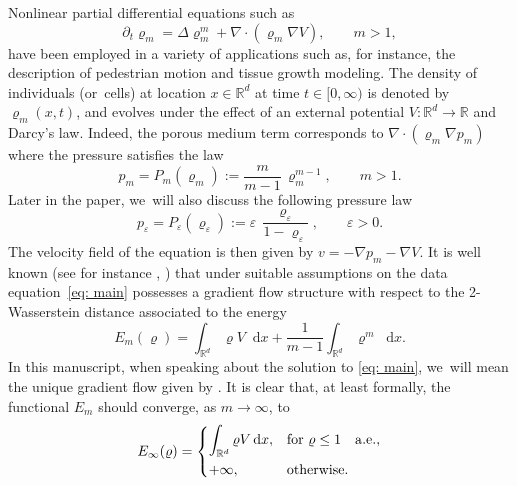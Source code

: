 \documentclass[JEP,XML,SOM,Unicode,published]{cedram}
\newcommand{\dx}[1]{\mathop{}\!\mathrm{d} #1}
\newcommand{\R}{\mathbb{R}}
\theoremstyle{plain}
\theoremstyle{remark}
\begin{document}
Nonlinear partial differential equations such as
\begin{equation}\label{eq: main}
\partial_{t} \varrho_m = \Delta \varrho_m^m + \nabla \cdot (\varrho_m \nabla V), \qquad m>1,
\end{equation}
have been employed in a variety of applications such as, for instance, the description of pedestrian motion and tissue growth modeling. The density of individuals (or~cells) at location $x\in\R^d$ at time $t \in [0,\infty)$ is denoted by $\varrho_m(x,t)$, and evolves under the effect of an external potential $V:\R^d\to\R$ and Darcy's law. Indeed, the porous medium term corresponds to $\nabla \cdot(\varrho_m\nabla p_m)$ where the pressure satisfies the law
\begin{equation}\label{eq: pressure power law}
p_m= P_m(\varrho_m):=\frac{m}{m-1}\, \varrho_m^{m-1}, \qquad m>1.
\end{equation}
Later in the paper, we~will also discuss the following pressure law
\begin{equation}
\label{singular pressure}
p_\varepsilon= P_\varepsilon(\varrho_\varepsilon):= \varepsilon\, \frac{\varrho_\varepsilon}{1-\varrho_\varepsilon}, \qquad \varepsilon>0.
\end{equation}
The velocity field of the equation is then given by $v = -\nabla p_m -\nabla V$.
It is well known (see for instance \cite[Th.\,11.2.8]{AGS2008}, \cite{Otto}) that under suitable assumptions on the data equation~\eqref{eq: main} possesses a gradient flow structure with respect to the 2\nobreakdash-Wasserstein distance associated to the energy
\begin{equation*}
\label{eq: energy}
E_m(\varrho)= \int_{\R^d} \varrho V \dx x + \frac{1}{m-1}\int_{\R^d} \varrho^m \dx x.
\end{equation*}
In this manuscript, when speaking about the solution to \eqref{eq: main}, we~will mean the unique gradient flow given by \cite[Th.\,11.2.8]{AGS2008}.
It is clear that, at least formally, the functional $E_m$ should converge, as $m\to\infty$, to
\begin{equation*}\label{eq: energy infty}
E_\infty(\varrho)=
\begin{dcases}
\int_{\R^d} \varrho V \dx x, &\text{for } \varrho\leq 1 \quad\mathrm{a.e.},\\
+\infty, &\text{otherwise.}
\end{dcases}
\end{equation*}
\end{document}
